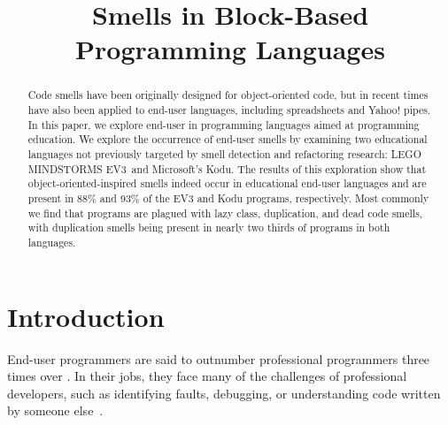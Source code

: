 \documentclass[conference]{IEEEtran}
\newcommand{\ms}{LEGO MINDSTORMS EV3}
\newcommand{\todo}[1]{\textbf{#1}}
\begin{document}
\title{Smells in Block-Based Programming Languages} %


\author{
\and
{}
\and
{}
}



\maketitle

\begin{abstract}
Code smells have been originally designed for object-oriented code, but in recent times have also been applied to end-user languages, including spreadsheets and Yahoo! pipes. In this paper, we explore end-user in programming languages aimed at programming education. 
We explore the occurrence of end-user smells by examining two educational languages not previously targeted by smell detection and refactoring research: \ms~and Microsoft's Kodu. The results of this exploration show that object-oriented-inspired smells indeed occur in educational end-user languages and are present in 88\% and 93\% of the EV3 and Kodu programs, respectively. Most commonly we find that programs are plagued with lazy class, duplication, and dead code smells, with duplication smells being present in nearly two thirds of programs in both languages. 
\end{abstract}


\section{Introduction}
End-user programmers are said to outnumber professional programmers three times over \cite{Scaf2005}. In their jobs, they face many of the challenges of professional developers, such as identifying faults, debugging, or understanding code written by someone else~\cite{Ko2011}. 
\end{document}
